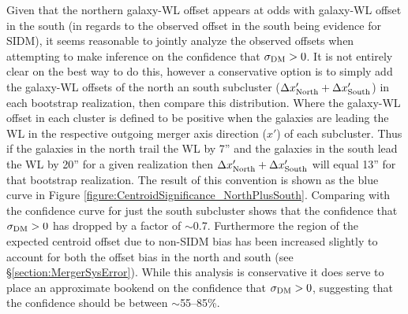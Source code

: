 Given that the northern galaxy-WL offset appears at odds with galaxy-WL offset in the south (in regards to the observed offset in the south being evidence for SIDM), it seems reasonable to jointly analyze the observed offsets when attempting to make inference on the confidence that $\sigma_{\rm DM}>0$. 
It is not entirely clear on the best way to do this, however a conservative option is to simply add the galaxy-WL offsets of the north an south subcluster ($\Delta x'_{\rm North}+\Delta x'_{\rm South}$) in each bootstrap realization, then compare this distribution.
Where the galaxy-WL offset in each cluster is defined to be positive when the galaxies are leading the WL in the respective outgoing merger axis direction ($x'$) of each subcluster.
Thus if the galaxies in the north trail the WL by 7'' and the galaxies in the south lead the WL by 20'' for a given realization then $\Delta x'_{\rm North}+\Delta x'_{\rm South}$ will equal 13'' for that bootstrap realization.
The result of this convention is shown as the blue curve in Figure \ref{figure:CentroidSignificance_NorthPlusSouth}.
Comparing with the confidence curve for just the south subcluster shows that the confidence that $\sigma_{\rm DM}>0$ has dropped by a factor of $\sim$0.7.
Furthermore the region of the expected centroid offset due to non-SIDM bias has been increased slightly to account for both the offset bias in the north and south (see \S\ref{section:MergerSysError}).
While this analysis is conservative it does serve to place an approximate bookend on the confidence that $\sigma_{\rm DM}>0$, suggesting that the confidence should be between $\sim$55--85\%.

